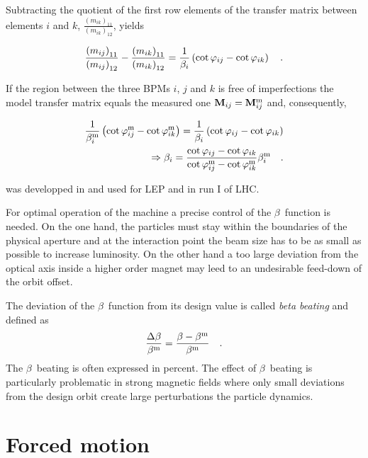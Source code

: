 Subtracting the quotient of the first row elements of the transfer matrix between elements $i$ and $k$,
$ \frac{\left(m_{ik}\right)_{11}}{\left(m_{ik}\right)_{12}}$, yields

\begin{equation}
    \frac{\left(m_{ij}\right)_{11}}{\left(m_{ij}\right)_{12}} - \frac{\left(m_{ik}\right)_{11}}{\left(m_{ik}\right)_{12}}
    =
    \frac{1}{\beta_i} \left( \cot\varphi_{ij} - \cot\varphi_{ik}\right)
    \quad .
\end{equation}

If the region between the three BPMs $i$, $j$ and $k$ is free of imperfections
the model transfer matrix equals the measured one
$\mathbf{M}_{ij} = \mathbf{M}_{ij}^\text{m}$ and, consequently,

\begin{align}
    \frac{1}{\beta_i^\text{m}} \left( \cot\varphi_{ij}^\text{m} - \cot \varphi_{ik}^\text{m} \right)
    =
    \frac{1}{\beta_i} \left( \cot\varphi_{ij} - \cot \varphi_{ik} \right) \notag \\
    \Rightarrow
    \beta_i = \frac{
        \cot\varphi_{ij} - \cot\varphi_{ik}
    }{
        \cot\varphi_{ij}^\text{m} - \cot\varphi_{ik}^\text{m}
    }
    \beta_i^\text{m}
    \quad .
    \label{eq_3bpm_method}
\end{align}

 was developped in \cite{Castro1996} and used for LEP and in run I of LHC.



For optimal operation of the machine a precise control of the $\beta$~function is needed. On the one
hand, the particles must stay within the boundaries of the physical aperture and 
at the interaction point the beam size has to be as small as possible to increase luminosity.
On the other hand a too large deviation from the optical axis inside a higher order magnet may leed to an undesirable
feed-down of the orbit offset.

The deviation of the $\beta$~function from its design value is called \emph{beta beating} and defined as 
\begin{equation}
    \frac{\Delta\beta}{\beta^\text{m}} = \frac{\beta - \beta^\text{m}}{\beta^\text{m}}
    \label{eq_def_beta_beat}
    \quad .
\end{equation}
The $\beta$~beating is often expressed in percent.
The effect of $\beta$~beating is particularly problematic in strong magnetic fields where only small
deviations from the design orbit create large perturbations the particle dynamics.






\section{Forced motion}




